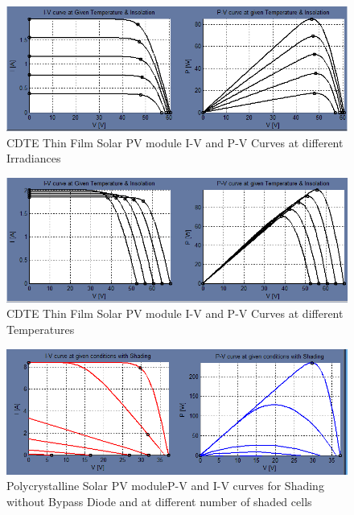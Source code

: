\documentclass[12pt]{article}
\begin{document}
\begin{figure}[H]
\centering
\includegraphics[scale=0.5]{CDTE_Irradiance}
\caption{CDTE Thin Film Solar PV module I-V and P-V Curves at different Irradiances}
\label{figc3h21} %
\end{figure}

\begin{figure}[H]
\centering
\includegraphics[scale=0.5]{CDTE_Temperature}
\caption{CDTE Thin Film Solar PV module I-V and P-V Curves at different Temperatures}
\label{figc3h22} %
\end{figure}

\begin{figure}[H]
\centering
\includegraphics[scale=0.5]{Poly_Shading_WithoutByPassDiode}
\caption{Polycrystalline Solar PV moduleP-V and I-V curves for Shading without Bypass Diode and at different number of shaded cells}
\label{figc3h23} %
\end{figure}
\end{document}
